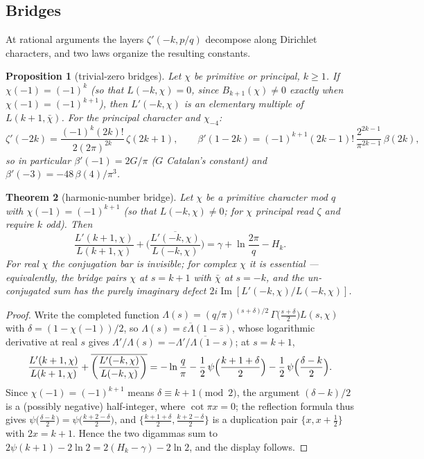 \documentclass[11pt]{article}
\newtheorem{theorem}{Theorem}[section]
\newtheorem{proposition}[theorem]{Proposition}
\theoremstyle{remark}
\begin{document}
\subsection{Bridges}\label{sec:negbridges}

At rational arguments the layers $\zeta'(-k,p/q)$ decompose along
Dirichlet characters, and two laws organize the resulting constants.

\begin{proposition}[trivial-zero bridges]\label{prop:tzbridge}
Let $\chi$ be primitive or principal, $k\ge1$.
If $\chi(-1)=(-1)^{k}$ (so that $L(-k,\chi)=0$, since
$B_{k+1}(\chi)\ne0$ exactly when $\chi(-1)=(-1)^{k+1}$), then $L'(-k,\chi)$
is an elementary multiple of $L(k+1,\bar\chi)$. For the principal character and
$\chi_{-4}$:
\[
\zeta'(-2k)=\frac{(-1)^k(2k)!}{2(2\pi)^{2k}}\,\zeta(2k+1),
\qquad
\beta'(1-2k)=(-1)^{k+1}(2k-1)!\,\frac{2^{2k-1}}{\pi^{2k-1}}\,\beta(2k),
\]
so in particular $\beta'(-1)=2G/\pi$ ($G$ Catalan's constant) and
$\beta'(-3)=-48\,\beta(4)/\pi^3$.
\end{proposition}

\begin{theorem}[harmonic-number bridge]\label{thm:hbridge}
Let $\chi$ be a primitive character mod $q$ with $\chi(-1)=(-1)^{k+1}$ (so
that $L(-k,\chi)\ne0$; for $\chi$ principal read $\zeta$ and require $k$
odd). Then
\[
\frac{L'(k+1,\chi)}{L(k+1,\chi)}
+\overline{\biggl(\frac{L'(-k,\chi)}{L(-k,\chi)}\biggr)}
=\gamma+\ln\frac{2\pi}{q}-H_k .
\]
For real $\chi$ the conjugation bar is invisible; for complex $\chi$ it is
essential — equivalently, the bridge pairs $\chi$ at $s=k+1$ with
$\bar\chi$ at $s=-k$, and the un-conjugated sum has the purely imaginary
defect $2i\operatorname{Im}[L'(-k,\chi)/L(-k,\chi)]$.
\end{theorem}

\begin{proof}
Write the completed function
$\Lambda(s)=(q/\pi)^{(s+\delta)/2}\,\Gamma\bigl(\tfrac{s+\delta}{2}\bigr)
L(s,\chi)$ with $\delta=(1-\chi(-1))/2$, so
$\Lambda(s)=\varepsilon\overline{\Lambda}(1-\bar s)$, whose logarithmic
derivative at real $s$ gives
$\Lambda'/\Lambda(s)=-\overline{\Lambda'/\Lambda(1-s)}$; at $s=k+1$,
\[
\frac{L'(k+1,\chi)}{L(k+1,\chi)}
+\overline{\biggl(\frac{L'(-k,\chi)}{L(-k,\chi)}\biggr)}
=-\ln\frac q\pi-\frac12\,
\psi\Bigl(\frac{k+1+\delta}2\Bigr)-\frac12\,\psi\Bigl(\frac{\delta-k}2\Bigr).
\]
Since $\chi(-1)=(-1)^{k+1}$ means $\delta\equiv k+1\pmod 2$, the argument
$(\delta-k)/2$ is a (possibly negative) half-integer, where
$\cot\pi x=0$; the reflection formula thus gives
$\psi\bigl(\tfrac{\delta-k}2\bigr)=\psi\bigl(\tfrac{k+2-\delta}2\bigr)$,
and $\bigl\{\tfrac{k+1+\delta}2,\tfrac{k+2-\delta}2\bigr\}$ is a
duplication pair $\{x,x+\tfrac12\}$ with $2x=k+1$. Hence the two digammas
sum to $2\psi(k+1)-2\ln2=2(H_k-\gamma)-2\ln2$, and the display follows.
\end{proof}
\end{document}
